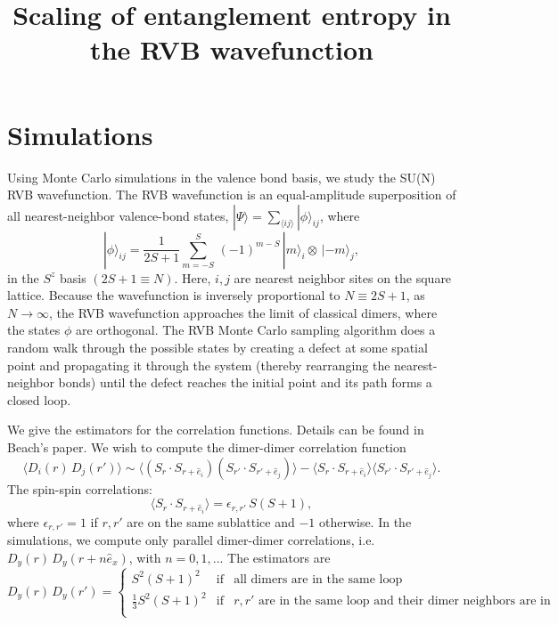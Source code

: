 \documentclass{article}
\title{Scaling of entanglement entropy in the RVB wavefunction}
\begin{document}
\maketitle

\section{Simulations}
Using Monte Carlo simulations in the valence bond basis, we study the SU(N) RVB wavefunction.
The RVB wavefunction is an equal-amplitude superposition of all nearest-neighbor valence-bond states, $| \Psi \rangle = \sum_{\langle i j \rangle} | \phi \rangle_{ij}$, where
%
\begin{equation}
	\displaystyle
	\label{eq:wf}
	| \phi \rangle_{ij} = \frac{1}{2S + 1} \sum_{m = -S}^{S} \, (-1)^{m-S} \, | m \rangle_i \otimes \, | -m \rangle_j,
\end{equation}
%
in the $S^z$ basis $(2S+1 \equiv N)$.
Here, $i, j$ are nearest neighbor sites on the square lattice.
Because the wavefunction is inversely proportional to $N \equiv 2S+1$, as $N \to \infty$, the RVB wavefunction approaches the limit of classical dimers, where the states $\phi$ are orthogonal.
The RVB Monte Carlo sampling algorithm does a random walk through the possible states by creating a defect at some spatial point and propagating it through the system (thereby rearranging the nearest-neighbor bonds) until the defect reaches the initial point and its path forms a closed loop.

We give the estimators for the correlation functions.
Details can be found in Beach's paper.
We wish to compute the dimer-dimer correlation function
%
\begin{equation}
	\langle D_i(r) \,D_j(r') \rangle \sim \langle (S_r \cdot S_{r+\hat{e}_i} ) (S_{r'} \cdot S_{r'+\hat{e}_j}) \rangle
			 - \langle S_r \cdot S_{r+\hat{e}_i} \rangle  \langle S_{r'} \cdot S_{r'+\hat{e}_j}\rangle.
\end{equation}
%
The spin-spin correlations:
%
\begin{equation}
	\langle S_r \cdot S_{r+\hat{e}_i} \rangle = \epsilon_{r,r'} \, S ( S+1),
\end{equation}
%
where $\epsilon_{r,r'} = 1$ if $r,r'$ are on the same sublattice and $-1$ otherwise.
%
In the simulations, we compute only parallel dimer-dimer correlations, i.e. $D_y(r) \, D_y(r+ n \hat{e}_x)$, with $n = 0, 1, ..$.
The estimators are
%
\begin{equation}
\displaystyle
D_y(r) \, D_y(r') = 
	\left\{ \begin{array}{rcl}
	S^2 ( S+1)^2 & \mbox{if} & \text{all dimers are in the same loop}\\
	 \frac{1}{3}S^2(S+1)^2 & \mbox{if} & r, r'\text{ are in the same loop and their dimer neighbors are in another loop}\\
	\end{array}\right.
\end{equation}
\end{document}
